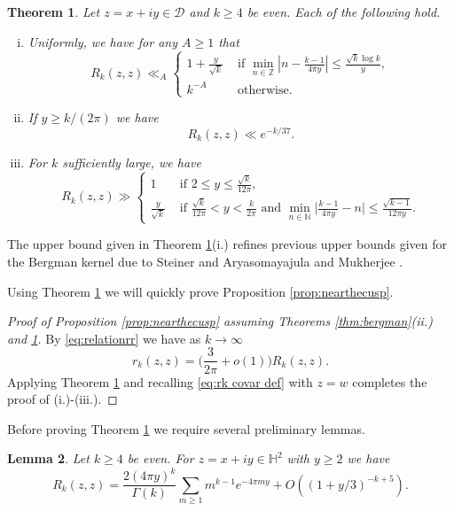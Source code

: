 \documentclass[12pt, a4paper]{amsart}
\newtheorem{theorem}{Theorem}[section]
\newtheorem{lemma}[theorem]{Lemma}
\theoremstyle{definition}
\newcommand {\1} {\mathbf{1}}
\newcommand {\Dc} {\mathcal{D}}
\numberwithin{equation}{section}
\begin{document}
\begin{theorem} \label{thm:nearthecusp}
Let $z=x+iy \in \Dc$ and $k \ge 4$ be even. Each of the following hold.
\begin{enumerate}[i.]
\item Uniformly, we have for any $A \ge 1$ that
\[
R_k(z,z) \ll_A \begin{cases}
1+\frac{y}{\sqrt{k}} & \text{ if }
\min_{n \in \mathbb Z} | n-\frac{k-1}{4\pi y}| \le \frac{\sqrt{k} \log k}{y}, \\
k^{-A} & \text{ otherwise.}
\end{cases}
\]
\item If $y \ge k/(2\pi)$ we have \[R_k(z,z) \ll e^{-k/37}.\]
\item For $k$ sufficiently large, we have
\[
R_k(z,z)\gg \displaystyle\begin{cases}
1 & \text{ if }  2 \le y \le \frac{\sqrt{k}}{12\pi}, \\
\frac{y}{\sqrt{k}} & \text{ if }  \frac{\sqrt{k}}{12\pi} < y < \frac{k}{2\pi}  \text{ and } \min_{n \in \mathbb N } \big|\frac{k-1}{4\pi y}-n\big| \le \frac{\sqrt{k-1}}{12 \pi y}.
\end{cases}
\]
\end{enumerate}
\end{theorem}

The upper bound given in Theorem \ref{thm:nearthecusp}(i.) refines previous upper bounds given for the Bergman kernel due to Steiner \cite[Proposition 3.2]{Steiner} and Aryasomayajula and Mukherjee \cite[Proposition 2.2]{am}.



Using Theorem \ref{thm:nearthecusp} we will quickly prove Proposition \ref{prop:nearthecusp}.

\begin{proof}[Proof of Proposition \ref{prop:nearthecusp} assuming Theorems \ref{thm:bergman}(ii.) and \ref{thm:nearthecusp}]
By \eqref{eq:relationrr} we have as $k \rightarrow \infty$
\[
r_k(z,z) =\bigg(\frac{3}{2 \pi}+o(1) \bigg)R_k(z,z).
\]
Applying Theorem \ref{thm:nearthecusp} and recalling \eqref{eq:rk covar def} with $z=w$ completes the proof of (i.)-(iii.). \end{proof}

Before proving Theorem \ref{thm:nearthecusp} we require several preliminary lemmas.

\begin{lemma} \label{lem:transform}
Let $k \ge 4$ be even.
For $z=x+iy \in \mathbb H^2$ with $y\ge 2$ we have
\[
R_k(z,z)
=\frac{2(4\pi y)^k}{\Gamma(k)}\sum_{m \ge 1} m^{k-1} e^{-4\pi m y}+O((1+y/3)^{-k+5}).
\]

\end{lemma}
\end{document}

